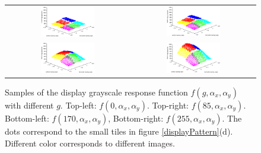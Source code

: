 \documentclass{report}
\begin{document}
\begin{figure}
\centering
\begin{tabular}{cc}
\includegraphics[width=0.45\textwidth]{images/response-gs0}&
\includegraphics[width=0.45\textwidth]{images/response-gs85} \\
\includegraphics[width=0.45\textwidth]{images/response-gs170}&
\includegraphics[width=0.45\textwidth]{images/response-gs255}

\end{tabular}
\caption{Samples of the display grayscale response function $f(g, \alpha_x, \alpha_y)$ with different $g$. Top-left: $f(0, \alpha_x, \alpha_y)$. Top-right: $f(85, \alpha_x, \alpha_y)$. Bottom-left: $f(170, \alpha_x, \alpha_y)$, Bottom-right: $f(255, \alpha_x, \alpha_y)$. The dots correspond to the small tiles in figure \ref{displayPattern}(d). Different color corresponds to different images. }
\label{displayResponse}
\end{figure}
\end{document}
